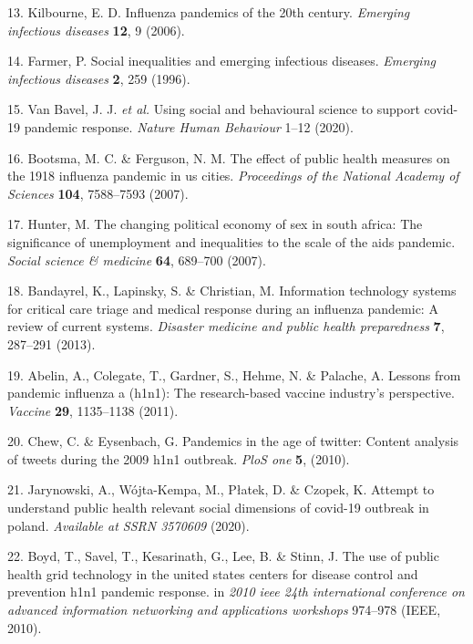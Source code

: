 \documentclass[]{article}
\begin{document}
\leavevmode\hypertarget{ref-kilbourne2006influenza}{}%
13. Kilbourne, E. D. Influenza pandemics of the 20th century. \emph{Emerging infectious diseases} \textbf{12}, 9 (2006).

\leavevmode\hypertarget{ref-farmer1996social}{}%
14. Farmer, P. Social inequalities and emerging infectious diseases. \emph{Emerging infectious diseases} \textbf{2}, 259 (1996).

\leavevmode\hypertarget{ref-van2020using}{}%
15. Van Bavel, J. J. \emph{et al.} Using social and behavioural science to support covid-19 pandemic response. \emph{Nature Human Behaviour} 1--12 (2020).

\leavevmode\hypertarget{ref-bootsma2007effect}{}%
16. Bootsma, M. C. \& Ferguson, N. M. The effect of public health measures on the 1918 influenza pandemic in us cities. \emph{Proceedings of the National Academy of Sciences} \textbf{104}, 7588--7593 (2007).

\leavevmode\hypertarget{ref-hunter2007changing}{}%
17. Hunter, M. The changing political economy of sex in south africa: The significance of unemployment and inequalities to the scale of the aids pandemic. \emph{Social science \& medicine} \textbf{64}, 689--700 (2007).

\leavevmode\hypertarget{ref-bandayrel2013information}{}%
18. Bandayrel, K., Lapinsky, S. \& Christian, M. Information technology systems for critical care triage and medical response during an influenza pandemic: A review of current systems. \emph{Disaster medicine and public health preparedness} \textbf{7}, 287--291 (2013).

\leavevmode\hypertarget{ref-abelin2011lessons}{}%
19. Abelin, A., Colegate, T., Gardner, S., Hehme, N. \& Palache, A. Lessons from pandemic influenza a (h1n1): The research-based vaccine industry's perspective. \emph{Vaccine} \textbf{29}, 1135--1138 (2011).

\leavevmode\hypertarget{ref-chew2010pandemics}{}%
20. Chew, C. \& Eysenbach, G. Pandemics in the age of twitter: Content analysis of tweets during the 2009 h1n1 outbreak. \emph{PloS one} \textbf{5}, (2010).

\leavevmode\hypertarget{ref-jarynowski2020attempt}{}%
21. Jarynowski, A., Wójta-Kempa, M., Płatek, D. \& Czopek, K. Attempt to understand public health relevant social dimensions of covid-19 outbreak in poland. \emph{Available at SSRN 3570609} (2020).

\leavevmode\hypertarget{ref-boyd2010use}{}%
22. Boyd, T., Savel, T., Kesarinath, G., Lee, B. \& Stinn, J. The use of public health grid technology in the united states centers for disease control and prevention h1n1 pandemic response. in \emph{2010 ieee 24th international conference on advanced information networking and applications workshops} 974--978 (IEEE, 2010).
\end{document}
